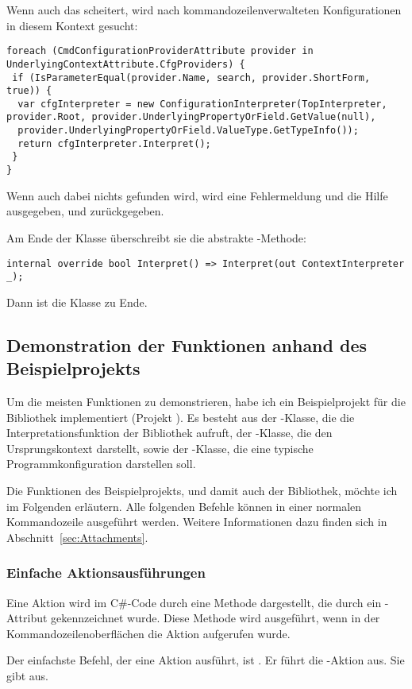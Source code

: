 Wenn auch das scheitert, wird nach kommandozeilenverwalteten Konfigurationen in diesem Kontext gesucht:
\begin{lstlisting}[title=""]
foreach (CmdConfigurationProviderAttribute provider in UnderlyingContextAttribute.CfgProviders) {
 if (IsParameterEqual(provider.Name, search, provider.ShortForm, true)) {
  var cfgInterpreter = new ConfigurationInterpreter(TopInterpreter, provider.Root, provider.UnderlyingPropertyOrField.GetValue(null),
  provider.UnderlyingPropertyOrField.ValueType.GetTypeInfo());
  return cfgInterpreter.Interpret();
 }
}
\end{lstlisting}
Wenn auch dabei nichts gefunden wird, wird eine Fehlermeldung und die Hilfe ausgegeben, und  zurückgegeben.

Am Ende der Klasse überschreibt sie die abstrakte -Methode:
\begin{lstlisting}[title=""]
 internal override bool Interpret() => Interpret(out ContextInterpreter _);
\end{lstlisting}
Dann ist die Klasse zu Ende.
\subsection{Demonstration der Funktionen anhand des Beispielprojekts}\label{subsec:demonstration}
Um die meisten Funktionen zu demonstrieren, habe ich ein Beispielprojekt für die Bibliothek implementiert (Projekt ).
Es besteht aus der -Klasse, die die Interpretationsfunktion der Bibliothek aufruft, der -Klasse, 
die den Ursprungskontext darstellt, sowie der -Klasse, die eine typische Programmkonfiguration darstellen soll.

Die Funktionen des Beispielprojekts, und damit auch der Bibliothek, möchte ich im Folgenden erläutern.
Alle folgenden Befehle können in einer normalen Kommandozeile ausgeführt werden.
Weitere Informationen dazu finden sich in Abschnitt~\ref{sec:Attachments}.%
\subsubsection{Einfache Aktionsausführungen}
Eine Aktion wird im C\#-Code durch eine Methode dargestellt, die durch ein -Attribut gekennzeichnet wurde.
Diese Methode wird ausgeführt, wenn in der Kommandozeilenoberflächen die Aktion aufgerufen wurde.

Der einfachste Befehl, der eine Aktion ausführt, ist .
Er führt die -Aktion aus.
Sie gibt  aus.

